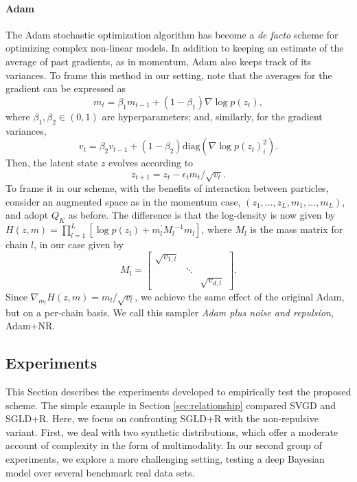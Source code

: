 \paragraph{Adam} The Adam stochastic optimization algorithm has become a \emph{de facto} scheme for optimizing complex non-linear models. In addition to keeping an estimate of the average of past gradients, as in momentum, Adam also keeps track of its variances.
To frame this method in our setting, note that the averages for the gradient can be expressed as
$$
{m}_t = \beta_1 {m}_{t-1} + (1 - \beta_1) \nabla \log p ({z}_t),
$$
where $\beta_1, \beta_2 \in (0, 1)$ are hyperparameters; and, similarly, for the gradient variances,
$$
{v}_t = \beta_2 {v}_{t-1} + (1 - \beta_2) \mbox{diag}(\nabla \log p ({z}_t)_i^2).
$$
Then, the latent state ${z}$ evolves according to
$$
{z}_{t+1} = {z}_t - \epsilon_t {m}_t / \sqrt{{v}_t}.
$$
To frame it in our scheme, with the benefits of interaction between particles,  consider an augmented space as in the momentum case, $({z}_1, \ldots, {z}_L, {m}_1, \ldots, {m}_L)$, and adopt ${Q_K}$ as before. The difference is that the log-density is now given by $H({z}, {m}) = \prod_{l=1} ^L \left[ \log p({z}_l) + {m}_l^{'} {M_l}^{-1} {m}_l \right]$, where ${M_l}$ is the mass matrix for chain $l$, in our case given by
$$
{M_l} = 
\begin{bmatrix}
\sqrt{v_{1,l}} & & \\
 & \ddots & \\
  & & \sqrt{v_{d,l}} 
\end{bmatrix}.
$$
Since $\nabla_{{m}_l} H({z},{m}) = {m}_l / \sqrt{{v}_l}$, we achieve the same effect of the original Adam, but on a per-chain basis. We call this sampler \emph{Adam plus noise and repulsion}, Adam+NR.





\subsection{Experiments}\label{sec:experiments_sgmcmc}

This Section describes the experiments developed to empirically test the proposed scheme. The simple example in Section \ref{sec:relationship} compared SVGD and SGLD+R. Here, we focus on confronting SGLD+R with the non-repulsive variant. First, we deal with two synthetic distributions, which offer a moderate account of complexity in the form of multimodality. In our second group of experiments, we explore a more challenging setting, testing a deep Bayesian model over several benchmark real data sets. 

